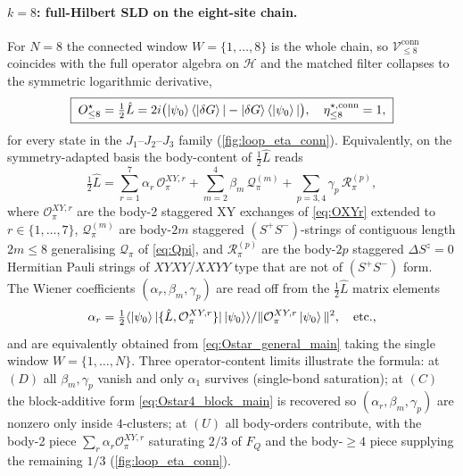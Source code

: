 \documentclass[11pt,a4paper]{article}
\newcommand{\FQ}{F_Q}
\newcommand{\SLD}{\hat{L}}
\newcommand{\PsiZ}{\ket{\psi_0}}
\newcommand{\dG}{\ket{\delta G}}
\newcommand{\Vconn}[1]{\mathcal{V}^{\mathrm{conn}}_{\le #1}}
\newcommand{\etaconn}[1]{\eta^{\star,\mathrm{conn}}_{\le #1}}
\providecommand{\anticomm}[2]{\{#1,#2\}}\renewcommand{\anticomm}[2]{\{#1,#2\}}
\begin{document}
\paragraph{$k=8$: full-Hilbert SLD on the eight-site chain.}
For $N=8$ the connected window $W=\{1,\dots,8\}$ is the whole
chain, so $\Vconn{8}$ coincides with the full operator algebra
on $\mathcal H$ and the matched filter collapses to the symmetric
logarithmic derivative,
\begin{equation}
   \boxed{\;O^\star_{\le 8}=\tfrac12\SLD
   =2i\bigl(\PsiZ\langle\dG|-\dG\langle\PsiZ|\bigr),\quad
   \etaconn{8}=1,\;}
   \label{eq:Ostar8_main}
\end{equation}
for every state in the $J_1$--$J_2$--$J_3$ family
(\cref{fig:loop_eta_conn}).  Equivalently, on the symmetry-adapted
basis the body-content of $\tfrac12\SLD$ reads
\begin{equation}
   \tfrac12\SLD=\sum_{r=1}^{7}\alpha_r\,\mathcal O^{XY,r}_\pi
     +\sum_{m=2}^{4}\beta_m\,\mathcal Q^{(m)}_\pi
     +\sum_{p=3,4}\gamma_p\,\mathcal R^{(p)}_\pi,
   \label{eq:Ostar8_decomp}
\end{equation}
where $\mathcal O^{XY,r}_\pi$ are the body-2 staggered XY
exchanges of \eqref{eq:OXYr} extended to $r\in\{1,\dots,7\}$,
$\mathcal Q^{(m)}_\pi$ are body-$2m$ staggered
$(S^+S^-)$-strings of contiguous length $2m\le 8$ generalising
$\mathcal Q_\pi$ of \eqref{eq:Qpi}, and $\mathcal R^{(p)}_\pi$
are the body-$2p$ staggered $\Delta S^z=0$ Hermitian Pauli
strings of $XYXY$/$XXYY$ type that are not of $(S^+S^-)$ form.
The Wiener coefficients $(\alpha_r,\beta_m,\gamma_p)$ are read
off from the $\tfrac12\SLD$ matrix elements
\begin{equation}
   \alpha_r=\tfrac12\langle\PsiZ|\anticomm{\SLD}{\mathcal O^{XY,r}_\pi}|\PsiZ\rangle/
               \Vert\mathcal O^{XY,r}_\pi\PsiZ\Vert^2,\quad\text{etc.,}
\end{equation}
and are equivalently obtained from
\eqref{eq:Ostar_general_main} taking the single window
$W=\{1,\dots,N\}$.  Three operator-content limits illustrate the
formula: at $(D)$ all $\beta_m,\gamma_p$ vanish and only
$\alpha_1$ survives (single-bond saturation); at $(C)$ the
block-additive form \eqref{eq:Ostar4_block_main} is recovered
so $(\alpha_r,\beta_m,\gamma_p)$ are nonzero only inside
$4$-clusters; at $(U)$ all body-orders contribute, with the
body-2 piece $\sum_r\alpha_r\mathcal O^{XY,r}_\pi$ saturating
$2/3$ of $\FQ$ and the body-$\ge 4$ piece supplying the
remaining $1/3$ (\cref{fig:loop_eta_conn}).
\end{document}
